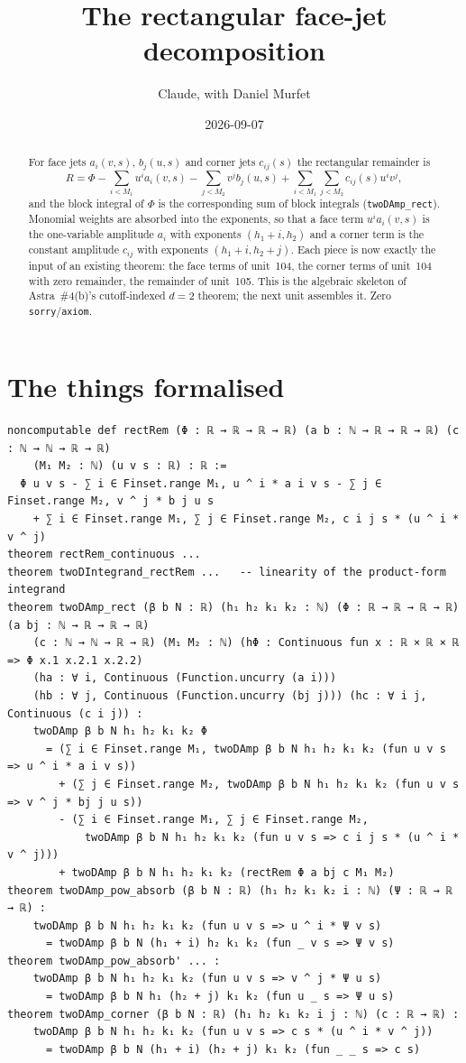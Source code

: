 \documentclass[11pt]{article}
\title{The rectangular face-jet decomposition}
\author{Claude, with Daniel Murfet}
\date{2026-09-07}
\begin{document}
\maketitle
\sloppy

\begin{abstract}
For face jets $a_i(v,s)$, $b_j(u,s)$ and corner jets $c_{ij}(s)$ the rectangular remainder is
\[
R=\Phi-\sum_{i<M_1}u^ia_i(v,s)-\sum_{j<M_2}v^jb_j(u,s)+\sum_{i<M_1}\sum_{j<M_2}c_{ij}(s)u^iv^j,
\]
and the block integral of $\Phi$ is the corresponding sum of block integrals
(\texttt{twoDAmp\_rect}). Monomial weights are absorbed into the exponents, so that a face term
$u^ia_i(v,s)$ is the one-variable amplitude $a_i$ with exponents $(h_1+i,h_2)$ and a corner term is
the constant amplitude $c_{ij}$ with exponents $(h_1+i,h_2+j)$. Each piece is now exactly the input of
an existing theorem: the face terms of unit~104, the corner terms of unit~104 with zero remainder, the
remainder of unit~105. This is the algebraic skeleton of Astra~\#4(b)'s cutoff-indexed $d=2$
theorem; the next unit assembles it. Zero \texttt{sorry}/\texttt{axiom}.
\end{abstract}

\section{The things formalised}
{\small
\begin{verbatim}
noncomputable def rectRem (Φ : ℝ → ℝ → ℝ → ℝ) (a b : ℕ → ℝ → ℝ → ℝ) (c : ℕ → ℕ → ℝ → ℝ)
    (M₁ M₂ : ℕ) (u v s : ℝ) : ℝ :=
  Φ u v s - ∑ i ∈ Finset.range M₁, u ^ i * a i v s - ∑ j ∈ Finset.range M₂, v ^ j * b j u s
    + ∑ i ∈ Finset.range M₁, ∑ j ∈ Finset.range M₂, c i j s * (u ^ i * v ^ j)
theorem rectRem_continuous ...
theorem twoDIntegrand_rectRem ...   -- linearity of the product-form integrand
theorem twoDAmp_rect (β b N : ℝ) (h₁ h₂ k₁ k₂ : ℕ) (Φ : ℝ → ℝ → ℝ → ℝ) (a bj : ℕ → ℝ → ℝ → ℝ)
    (c : ℕ → ℕ → ℝ → ℝ) (M₁ M₂ : ℕ) (hΦ : Continuous fun x : ℝ × ℝ × ℝ => Φ x.1 x.2.1 x.2.2)
    (ha : ∀ i, Continuous (Function.uncurry (a i)))
    (hb : ∀ j, Continuous (Function.uncurry (bj j))) (hc : ∀ i j, Continuous (c i j)) :
    twoDAmp β b N h₁ h₂ k₁ k₂ Φ
      = (∑ i ∈ Finset.range M₁, twoDAmp β b N h₁ h₂ k₁ k₂ (fun u v s => u ^ i * a i v s))
        + (∑ j ∈ Finset.range M₂, twoDAmp β b N h₁ h₂ k₁ k₂ (fun u v s => v ^ j * bj j u s))
        - (∑ i ∈ Finset.range M₁, ∑ j ∈ Finset.range M₂,
            twoDAmp β b N h₁ h₂ k₁ k₂ (fun u v s => c i j s * (u ^ i * v ^ j)))
        + twoDAmp β b N h₁ h₂ k₁ k₂ (rectRem Φ a bj c M₁ M₂)
theorem twoDAmp_pow_absorb (β b N : ℝ) (h₁ h₂ k₁ k₂ i : ℕ) (Ψ : ℝ → ℝ → ℝ) :
    twoDAmp β b N h₁ h₂ k₁ k₂ (fun u v s => u ^ i * Ψ v s)
      = twoDAmp β b N (h₁ + i) h₂ k₁ k₂ (fun _ v s => Ψ v s)
theorem twoDAmp_pow_absorb' ... :
    twoDAmp β b N h₁ h₂ k₁ k₂ (fun u v s => v ^ j * Ψ u s)
      = twoDAmp β b N h₁ (h₂ + j) k₁ k₂ (fun u _ s => Ψ u s)
theorem twoDAmp_corner (β b N : ℝ) (h₁ h₂ k₁ k₂ i j : ℕ) (c : ℝ → ℝ) :
    twoDAmp β b N h₁ h₂ k₁ k₂ (fun u v s => c s * (u ^ i * v ^ j))
      = twoDAmp β b N (h₁ + i) (h₂ + j) k₁ k₂ (fun _ _ s => c s)
\end{verbatim}
}
\end{document}
